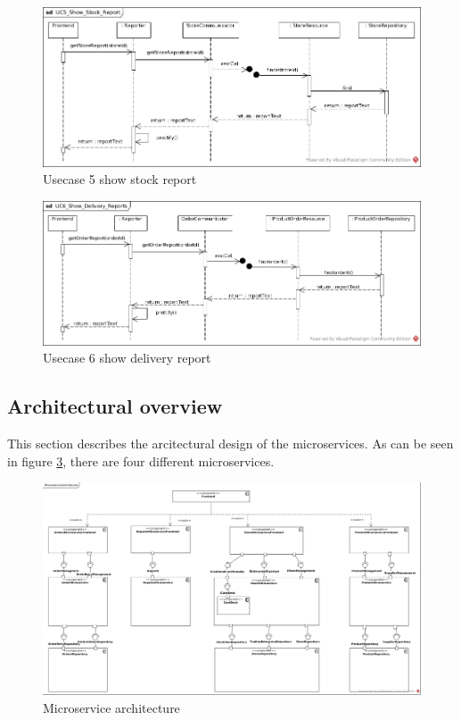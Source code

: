 			\begin{figure}[!h]
				\centering
				\includegraphics[width = 1\textwidth]{img/UC5_Show_Stock_Report.jpg}
				\caption{Usecase 5 show stock report}
				\label{MS_UC5}
			\end{figure}
			
			\begin{figure}[!h]
				\centering
				\includegraphics[width = 1\textwidth]{img/UC6_Show_Delivery_Reports.jpg}
				\caption{Usecase 6 show delivery report}
				\label{MS_UC6}
			\end{figure}
			
	\FloatBarrier
	\subsection{Architectural overview}	\label{archiOverviewMicro}	
	This section describes the arcitectural design of the microservices. As can be seen in figure \ref{MS_ARch}, there are four different microservices.
	   \begin{figure}
	   	\includegraphics[width=\textwidth]{img/MicroserviceArchitecture.jpg}
	   	\caption{Microservice architecture}
	   	\label{MS_ARch}
	   \end{figure}

